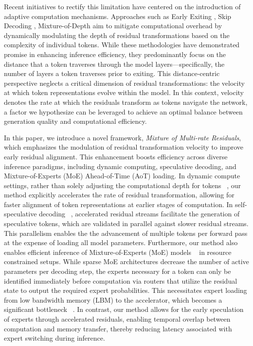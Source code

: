 Recent initiatives to rectify this limitation have centered on the introduction of adaptive computation mechanisms. Approaches such as Early Exiting \cite{schuster2022confident, varshney-etal-2024-investigating, chen2023eellm}, Skip Decoding \cite{delcorro2023skipdecode}, Mixture-of-Depth \cite{raposo2024mixture} aim to mitigate computational overhead by dynamically modulating the depth of residual transformations based on the complexity of individual tokens. While these methodologies have demonstrated promise in enhancing inference efficiency, they predominantly focus on the distance that a token traverses through the model layers—specifically, the number of layers a token traverses prior to exiting. This distance-centric perspective neglects a critical dimension of residual transformations: the velocity at which token representations evolve within the model. In this context, velocity denotes the rate at which the residuals transform as tokens navigate the network, a factor we hypothesize can be leveraged to achieve an optimal balance between generation quality and computational efficiency.

In this paper, we introduce a novel framework, \textit{Mixture of Multi-rate Residuals}, which emphasizes the modulation of residual transformation velocity to improve early residual alignment. This enhancement boosts efficiency across diverse inference paradigms, including dynamic computing, speculative decoding, and Mixture-of-Experts (MoE) Ahead-of-Time (AoT) loading. In dynamic compute settings, rather than solely adjusting the computational depth for tokens ~\cite{chen2023eellm, schuster2022confident, delcorro2023skipdecode, Tang2024}, our method explicitly accelerates the rate of residual transformation, allowing for faster alignment of token representations at earlier stages of computation. In self-speculative decoding ~\cite{leviathan2023fast, chen2023accelerating}, accelerated residual streams facilitate the generation of speculative tokens, which are validated in parallel against slower residual streams. This parallelism enables the the advancement of multiple tokens per forward pass at the expense of loading all model parameters. Furthermore, our method also enables efficient inference of Mixture-of-Experts (MoE) models ~\cite{shazeer2017outrageously, fedus2022switch} in resource constrained setups. While sparse MoE architectures decrease the number of active parameters per decoding step, the experts necessary for a token can only be identified immediately before computation via routers that utilize the residual state to output the required expert probabilities. This necessitates expert loading from low bandwidth memory (LBM) to the accelerator, which becomes a significant bottleneck ~\cite{lepikhin2020gshard, fedus2022switch}. In contrast, our method allows for the early speculation of experts through accelerated residuals, enabling temporal overlap between computation and memory transfer, thereby reducing latency associated with expert switching during inference. 

